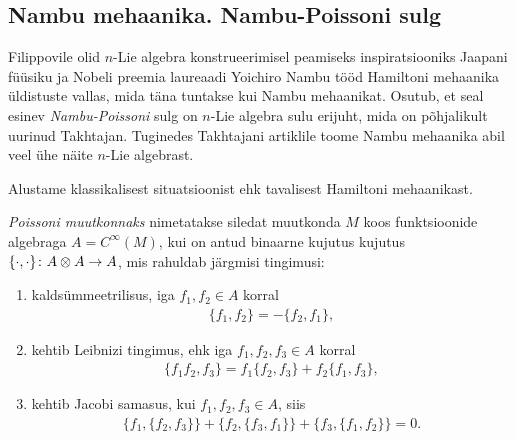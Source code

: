 \subsection{Nambu mehaanika. Nambu-Poissoni sulg}

Filippovile olid $n$-Lie algebra konstrueerimisel peamiseks
inspiratsiooniks Jaapani füüsiku ja Nobeli preemia laureaadi
Yoichiro Nambu tööd Hamiltoni mehaanika
üldistuste vallas, mida täna tuntakse kui Nambu mehaanikat. Osutub, et
seal esinev \emph{Nambu-Poissoni} sulg on $n$-Lie algebra sulu erijuht,
mida on põhjalikult uurinud Takhtajan.\cite{takhtajan1994}
Tuginedes Takhtajani artiklile toome Nambu mehaanika abil veel ühe
näite $n$-Lie algebrast.

Alustame klassikalisest situatsioonist ehk tavalisest Hamiltoni mehaanikast.

\begin{dfn}
    \emph{Poissoni muutkonnaks} nimetatakse siledat muutkonda $M$ koos
    funktsioonide algebraga $A = C^\infty(M)$, kui on antud binaarne kujutus
    kujutus $\{\cdot, \cdot\} \colon A \otimes A \to A$, mis rahuldab
    järgmisi tingimusi:
    \begin{enumerate}
      \item kaldsümmeetrilisus, iga $f_1, f_2 \in A$ korral
          \begin{align}\label{eq:poisson-antisymm}
              \{f_1, f_2\} = -\{f_2, f_1\},
          \end{align}
      \item kehtib Leibnizi tingimus, ehk iga $f_1, f_2, f_3 \in A$ korral
          \begin{align}
              \{f_1 f_2, f_3\} = f_1 \{f_2, f_3\} + f_2 \{f_1, f_3\},
          \end{align}
      \item kehtib Jacobi samasus, kui $f_1, f_2, f_3 \in A$, siis
          \begin{align}\label{eq:poisson-jacobi-id}
              \{f_1, \{f_2, f_3\}\} + \{f_2, \{f_3, f_1\}\} +
              \{f_3, \{f_1, f_2\}\} = 0.
          \end{align}
    \end{enumerate}
\end{dfn}

